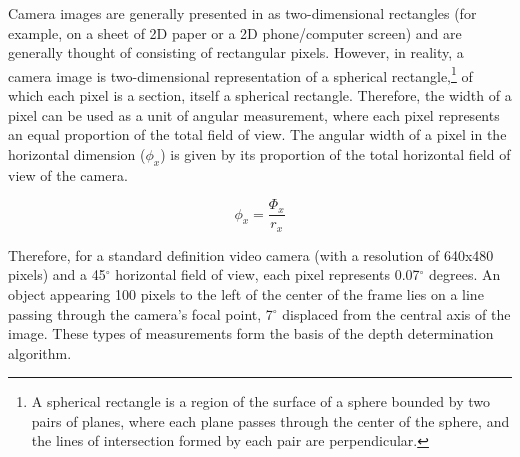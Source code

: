 \documentclass{article}
\begin{document}
Camera images are generally presented in as two-dimensional rectangles (for example, on a sheet of 2D paper or a 2D phone/computer screen) and are generally thought of consisting of rectangular pixels.
However, in reality, a camera image is two-dimensional representation of a spherical rectangle,\footnote{A spherical rectangle is a region of the surface of a sphere bounded by two pairs of planes, where each plane passes through the center of the sphere, and the lines of intersection formed by each pair are perpendicular.} of which each pixel is a section, itself a spherical rectangle.
Therefore, the width of a pixel can be used as a unit of angular measurement, where each pixel represents an equal proportion of the total field of view.
The angular width of a pixel in the horizontal dimension ($\phi_x$) is given by its proportion of the total horizontal field of view of the camera.

$$ \phi_x = \frac{\Phi_x}{r_x} $$

Therefore, for a standard definition video camera (with a resolution of 640x480 pixels) and a 45$^{\circ}$ horizontal field of view, each pixel represents 0.07$^\circ$ degrees.
An object appearing 100 pixels to the left of the center of the frame lies on a line passing through the camera's focal point, 7$^\circ$ displaced from the central axis of the image.
These types of measurements form the basis of the depth determination algorithm.
\end{document}
